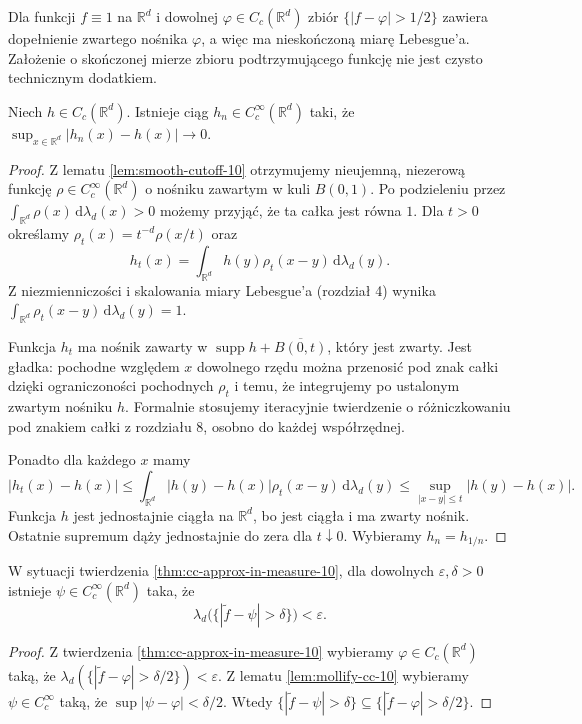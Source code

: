 \begin{uwaga}
Dla funkcji $f\equiv1$ na $\mathbb R^d$ i dowolnej
$\varphi\in C_c(\mathbb R^d)$ zbiór
$\{|f-\varphi|>1/2\}$ zawiera dopełnienie
zwartego nośnika $\varphi$, a więc ma nieskończoną
miarę Lebesgue'a. Założenie o skończonej mierze
zbioru podtrzymującego funkcję nie jest czysto
technicznym dodatkiem.
\end{uwaga}

\begin{lemat}
\label{lem:mollify-cc-10}
Niech $h\in C_c(\mathbb R^d)$. Istnieje ciąg
$h_n\in C_c^\infty(\mathbb R^d)$ taki, że
$\sup_{x\in\mathbb R^d}|h_n(x)-h(x)|\to0$.
\end{lemat}
\begin{proof}
Z lematu \ref{lem:smooth-cutoff-10} otrzymujemy
nieujemną, niezerową funkcję
$\rho\in C_c^\infty(\mathbb R^d)$ o nośniku
zawartym w kuli $B(0,1)$. Po podzieleniu przez
$\int_{\mathbb R^d}\rho(x)\,\mathrm d\lambda_d(x)>0$
możemy przyjąć, że ta całka jest równa $1$.
Dla $t>0$ określamy
$\rho_t(x)=t^{-d}\rho(x/t)$ oraz
\[
h_t(x)=\int_{\mathbb R^d}
 h(y)\rho_t(x-y)\,\mathrm d\lambda_d(y).
\]
Z niezmienniczości i skalowania miary Lebesgue'a
(rozdział 4) wynika
$\int_{\mathbb R^d}\rho_t(x-y)\,\mathrm d\lambda_d(y)=1$.

Funkcja $h_t$ ma nośnik zawarty w
$\operatorname{supp}h+\overline{B(0,t)}$,
który jest zwarty. Jest gładka: pochodne względem
$x$ dowolnego rzędu można przenosić pod znak
całki dzięki ograniczoności pochodnych $\rho_t$
i temu, że integrujemy po ustalonym zwartym
nośniku $h$. Formalnie stosujemy iteracyjnie
twierdzenie o różniczkowaniu pod znakiem całki
z rozdziału 8, osobno do każdej współrzędnej.

Ponadto dla każdego $x$ mamy
\[
|h_t(x)-h(x)|
\le\int_{\mathbb R^d}|h(y)-h(x)|\rho_t(x-y)
\,\mathrm d\lambda_d(y)
\le\sup_{|x-y|\le t}|h(y)-h(x)|.
\]
Funkcja $h$ jest jednostajnie ciągła na
$\mathbb R^d$, bo jest ciągła i ma zwarty nośnik.
Ostatnie supremum dąży jednostajnie do zera dla
$t\downarrow0$. Wybieramy $h_n=h_{1/n}$.
\end{proof}

\begin{wniosek}
\label{cor:smooth-approx-in-measure-10}
W sytuacji twierdzenia
\ref{thm:cc-approx-in-measure-10}, dla dowolnych
$\varepsilon,\delta>0$ istnieje
$\psi\in C_c^\infty(\mathbb R^d)$ taka, że
\[
\lambda_d\bigl(\{|\widetilde f-\psi|>\delta\}\bigr)
<\varepsilon.
\]
\end{wniosek}
\begin{proof}
Z twierdzenia \ref{thm:cc-approx-in-measure-10}
wybieramy $\varphi\in C_c(\mathbb R^d)$ taką,
że $\lambda_d(\{|\widetilde f-\varphi|>
\delta/2\})<\varepsilon$.
Z lematu \ref{lem:mollify-cc-10} wybieramy
$\psi\in C_c^\infty$ taką, że
$\sup|\psi-\varphi|<\delta/2$.
Wtedy
$\{|\widetilde f-\psi|>\delta\}\subseteq
\{|\widetilde f-\varphi|>\delta/2\}$.
\end{proof}

